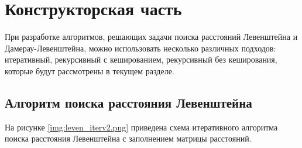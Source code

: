\chapter{Конструкторская часть}

 При разработке алгоритмов, решающих задачи поиска расстояний Левенштейна и Дамерау-Левенштейна, можно использовать несколько различных подходов: итеративный, рекурсивный с кешированием, рекурсивный без кеширования, которые будут рассмотрены в текущем разделе.
 

\section{Алгоритм поиска расстояния Левенштейна}

На рисунке \ref{img:leven_iterv2.png} приведена схема итеративного алгоритма поиска расстояния Левенштейна с заполнением матрицы расстояний.
\\
\\
\\
\\
\\
\\
\\
\\
\\
\\
\\
\\
\\
\\
\\
\\



\FloatBarrier

